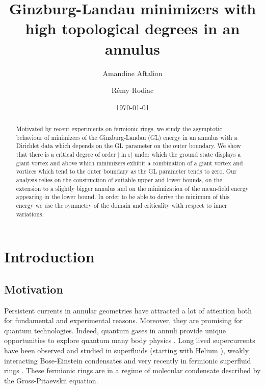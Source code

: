 \documentclass[12pt,reqno]{amsart}
\title[]{Ginzburg-Landau minimizers with high topological degrees in an annulus}
\date{\today}
\author{Amandine Aftalion}
\author{Rémy Rodiac}
\def\e {{\varepsilon}}
\numberwithin{equation}{section}
\begin{document}
\begin{abstract}
Motivated by recent experiments on fermionic rings, we study the asymptotic behaviour of minimizers of the Ginzburg-Landau (GL) energy in an annulus with a Dirichlet data which depends on the GL parameter on the outer boundary.  We show that there is a critical degree of order $|\ln \e|$  under which the ground state displays a giant vortex and above which minimizers exhibit a combination of a giant vortex and vortices which tend to the outer boundary as the GL parameter tends to zero. Our analysis relies on the construction of suitable upper and lower bounds, on the extension to a slightly bigger annulus and on the minimization of the mean-field energy appearing in the lower bound. In order to be able to derive the minimum of this energy we use the symmetry of the domain and criticality with respect to inner variations.
\end{abstract}


\maketitle

\maketitle




\section{Introduction}

\subsection{Motivation}

 Persistent currents in annular geometries have attracted a lot of attention both for fundamental and experimental reasons. Moreover, they are promising for quantum technologies. Indeed, quantum gases in annuli provide
 unique opportunities to explore quantum many body physics \cite{persistent2024}. Long lived supercurrents have been observed and studied in superfluids (starting with Helium \cite{fetter67}), weakly interacting Bose-Einstein condensates \cite{perrin,zoran} and very recently in fermionic superfluid rings \cite{cai2022,Roati}. These fermionic rings are in a regime of molecular condensate described by the Gross-Pitaevskii equation. 
\end{document}
